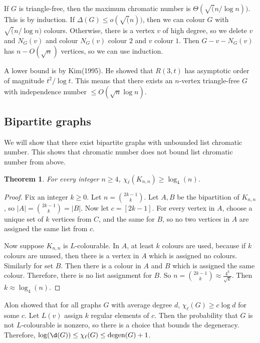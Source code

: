 \documentclass[]{article}
\newcommand{\degen}{\text{degen}}
\newtheorem{theorem}{Theorem}
\theoremstyle{definition}
\numberwithin{theorem}{section}
\numberwithin{equation}{section}
\begin{document}
If $G$ is triangle-free, then the maximum chromatic number is $\Theta(\sqrt(n/\log n))$. This is by induction. If $\Delta(G) \leq o(\sqrt(n))$, then we can colour $G$ with $\sqrt(n/\log n)$ colours. Otherwise, there is a vertex $v$ of high degree, so we delete $v$ and $N_G(v)$ and colour $N_G(v)$ colour $2$ and $v$ colour $1$. Then $G - v - N_G(v)$ has $n - O(\sqrt{n})$ vertices, so we can use induction.

A lower bound is by Kim(1995). He showed that $R(3, t)$ has asymptotic order of magnitude $t^2/ \log t$. This means that there exists an $n$-vertex triangle-free $G$ with independence number $\leq O(\sqrt{n} \log n)$. 

\subsection{Bipartite graphs}
We will show that there exist bipartite graphs with unbounded list chromatic number. This shows that chromatic number does not bound list chromatic number from above. 

\begin{theorem}
	For every integer $n \geq 4$, $\chi_\ell(K_{n,n}) \geq \log_4(n)$.
\end{theorem}

\begin{proof}
	Fix an integer $k \geq 0$. Let $n = \binom{2k-1}{k}$. Let $A, B$ be the bipartition of $K_{n,n}$, so $|A| = \binom{2k-1}{k} = |B|$. Now let $c = [2k-1]$. For every vertex in $A$, choose a unique set of $k$ vertices from $C$, and the same for $B$, so no two vertices in $A$ are assigned the same list from $c$.
	
	Now suppose $K_{n,n}$ is $L$-colourable. In $A$, at least $k$ colours are used, because if $k$ colours are unused, then there is a vertex in $A$ which is assigned no colours. Similarly for set $B$. Then there is a colour in $A$ and $B$ which is assigned the same colour. Therefore, there is no list assignment for $B$. So $n = \binom{2k-1}{k} \approx \frac{4^k}{\sqrt{k}}$. Then $k \approx \log_4(n)$. 
\end{proof}

Alon showed that for all graphs $G$ with average degree $d$, $\chi_\ell(G) \geq c \log d$ for some $c$. Let $L(v)$ assign $k$ regular elements of $c$. Then the probability that $G$ is not $L$-colourable is nonzero, so there is a choice that bounds the degeneracy. Therefore, 
$\log(\d(G))\leq \chi_\ell(G) \leq \degen(G) + 1$. 
\end{document}
